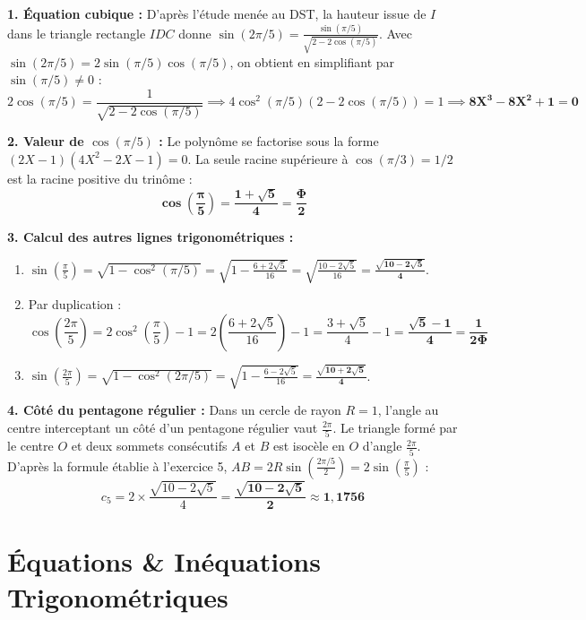 \documentclass[11pt,a4paper]{article}
\begin{document}
\begin{correctionbox}
\textbf{1. Équation cubique :}
D'après l'étude menée au DST, la hauteur issue de $I$ dans le triangle rectangle $IDC$ donne $\sin(2\pi/5) = \frac{\sin(\pi/5)}{\sqrt{2 - 2\cos(\pi/5)}}$.
Avec $\sin(2\pi/5) = 2\sin(\pi/5)\cos(\pi/5)$, on obtient en simplifiant par $\sin(\pi/5) \neq 0$ :
\[
2\cos(\pi/5) = \frac{1}{\sqrt{2 - 2\cos(\pi/5)}} \implies 4\cos^2(\pi/5)(2 - 2\cos(\pi/5)) = 1 \implies \mathbf{8X^3 - 8X^2 + 1 = 0}
\]

\textbf{2. Valeur de $\cos(\pi/5)$ :}
Le polynôme se factorise sous la forme $(2X - 1)(4X^2 - 2X - 1) = 0$.
La seule racine supérieure à $\cos(\pi/3) = 1/2$ est la racine positive du trinôme :
\[
\mathbf{\cos\left(\frac{\pi}{5}\right) = \frac{1 + \sqrt{5}}{4} = \frac{\Phi}{2}}
\]

\textbf{3. Calcul des autres lignes trigonométriques :}
\begin{enumerate}
    \item $\sin\left(\frac{\pi}{5}\right) = \sqrt{1 - \cos^2(\pi/5)} = \sqrt{1 - \frac{6 + 2\sqrt{5}}{16}} = \sqrt{\frac{10 - 2\sqrt{5}}{16}} = \mathbf{\frac{\sqrt{10 - 2\sqrt{5}}}{4}}$.
    \item Par duplication :
    \[
    \cos\left(\frac{2\pi}{5}\right) = 2\cos^2\left(\frac{\pi}{5}\right) - 1 = 2 \left(\frac{6 + 2\sqrt{5}}{16}\right) - 1 = \frac{3 + \sqrt{5}}{4} - 1 = \mathbf{\frac{\sqrt{5} - 1}{4} = \frac{1}{2\Phi}}
    \]
    \item $\sin\left(\frac{2\pi}{5}\right) = \sqrt{1 - \cos^2(2\pi/5)} = \sqrt{1 - \frac{6 - 2\sqrt{5}}{16}} = \mathbf{\frac{\sqrt{10 + 2\sqrt{5}}}{4}}$.
\end{enumerate}

\textbf{4. Côté du pentagone régulier :}
Dans un cercle de rayon $R = 1$, l'angle au centre interceptant un côté d'un pentagone régulier vaut $\frac{2\pi}{5}$.
Le triangle formé par le centre $O$ et deux sommets consécutifs $A$ et $B$ est isocèle en $O$ d'angle $\frac{2\pi}{5}$.
D'après la formule établie à l'exercice 5, $AB = 2 R \sin\left(\frac{2\pi/5}{2}\right) = 2 \sin\left(\frac{\pi}{5}\right)$ :
\[
c_5 = 2 \times \frac{\sqrt{10 - 2\sqrt{5}}}{4} = \mathbf{\frac{\sqrt{10 - 2\sqrt{5}}}{2} \approx 1{,}1756}
\]
\end{correctionbox}

\vspace{0.4cm}

\section{Équations \& Inéquations Trigonométriques}
\end{document}
